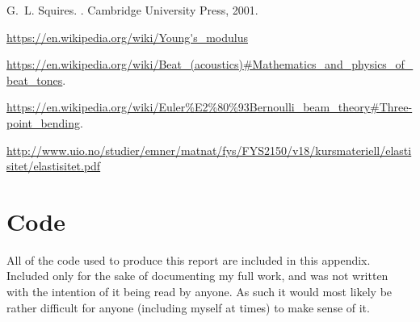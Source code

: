 \documentclass[11pt,a4paper]{article}
\begin{document}



\begin{thebibliography}{1}

G.~L. Squires.
.
\newblock Cambridge University Press, 2001.

\url {https://en.wikipedia.org/wiki/Young's_modulus}

\url{https://en.wikipedia.org/wiki/Beat_(acoustics)#Mathematics_and_physics_of_beat_tones}.

\bibitem{3pt}
\url{https://en.wikipedia.org/wiki/Euler%E2%80%93Bernoulli_beam_theory#Three-point_bending}.

\url{http://www.uio.no/studier/emner/matnat/fys/FYS2150/v18/kursmateriell/elastisitet/elastisitet.pdf}


\end{thebibliography}

\appendix*
\section{Code}
All of the code used to produce this report are included in this appendix. Included only for the sake of documenting my full work, and was not written with the intention of it being read by anyone. As such it would most likely be rather difficult for anyone (including myself at times) to make sense of it.



\end{document}
